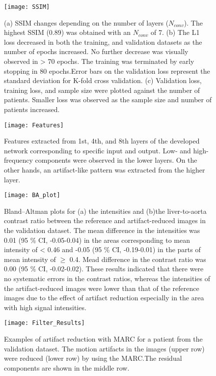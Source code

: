 \documentclass[num-refs]{wiley-article}
\begin{document}
\begin{figure}[bt]
\centering
\texttt{[image: SSIM]}
\caption{(a) SSIM changes depending on the number of layers ($N_{conv}$). The highest SSIM (0.89) was obtained with an $N_{conv}$ of 7. (b) The L1 loss decreased in both the training, and validation datasets as the number of epochs increased. No further decrease was visually observed in > 70 epochs. The training was terminated by early stopping in 80 epochs.Error bars on the validation loss represent the standard deviation for K-fold cross validation. (c) Validation loss, training loss, and sample size were plotted against the number of patients. Smaller loss was observed as the sample size and number of patients increased.}
\label{fig_SSIM}
\end{figure}


\begin{figure}[bt]
\centering
\texttt{[image: Features]}
\caption{Features extracted from 1st, 4th, and 8th layers of the developed network corresponding to specific input and output. Low- and high-frequency components were observed in the lower layers. On the other hands, an artifact-like pattern was extracted from the higher layer.}
\label{fig_Features}
\end{figure}


\begin{figure}[bt]
\centering
\texttt{[image: BA\_plot]}
\caption{Bland–Altman plots for (a) the intensities and (b)the liver-to-aorta contrast ratio between the reference and artifact-reduced images in the validation dataset. The mean difference in the intensities was 0.01 (95 \% CI, -0.05-0.04) in the areas corresponding to mean intensity of < 0.46 and -0.05 (95 \% CI, -0.19-0.01) in the parts of mean intensity of $\geq$ 0.4. Mead difference in the contrast ratio was 0.00 (95 \% CI, -0.02-0.02). These results indicated that there were no systematic errors in the contrast ratios, whereas the intensities of the artifact-reduced images were lower than that of the reference images due to the effect of artifact reduction especially in the area with high signal intensities. }
\label{fig_BAplot}
\end{figure}


\begin{figure}[bt]
\centering
\texttt{[image: Filter\_Results]}
\caption{Examples of artifact reduction with MARC for a patient from the validation dataset. The motion artifacts in the images (upper row) were reduced (lower row) by using the MARC.The residual components are shown in the middle row.}
\label{fig_results}
\end{figure}
\end{document}
